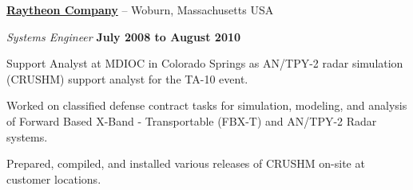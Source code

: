 \documentclass[8pt]{article}
\newenvironment{outerlist}[1][\enskip\textbullet]%
       {\begin{compactenum}[#1]}{\end{compactenum}%
        \vspace{-.3\baselineskip}}
\newenvironment{innerlist}[1][\enskip\textbullet]%
        {\begin{compactenum}[#1]}{\end{compactenum}}
\def\CC{{C\nolinebreak[4]\hspace{-.05em}\raisebox{.4ex}{\tiny\bf ++}}}
\begin{document}
                \href{http://www.raytheon.com/}{\textbf{Raytheon Company}} -- Woburn, Massachusetts USA
                \begin{outerlist}
                        \item[] \textit{Systems Engineer}%
                                \hfill \textbf{July 2008 to August 2010}
                        \begin{innerlist}
                                \item Support Analyst at MDIOC in Colorado Springs as AN/TPY-2 radar simulation (CRUSHM) support analyst for the TA-10 event.
                                \item Worked on classified defense contract tasks for simulation, modeling, and analysis of Forward Based X-Band - Transportable (FBX-T) and AN/TPY-2 Radar systems.
                                \item Prepared, compiled, and installed various releases of CRUSHM on-site at customer locations.
                        \end{innerlist}
                \end{outerlist}
\end{document}
